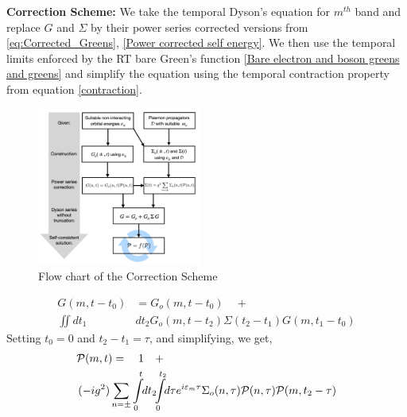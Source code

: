 \documentclass[%
 reprint,
 amsmath,amssymb,
 aps,prl,
floatfix
]{revtex4-2}
\begin{document}
\textbf{Correction Scheme: }We take the temporal Dyson's equation for $m^{th}$ band and replace $G$ and $\Sigma$ by their power series corrected versions from \eqref{eq:Corrected_Greens}, \eqref{Power corrected self energy}. We then use the temporal limits enforced by the RT bare Green's function \eqref{Bare electron and boson greens and  greens} and simplify the equation using the temporal contraction property from equation \eqref{contraction}. 
 \begin{figure}
    \centering
    \includegraphics[height = 9 cm,width = 0.48\textwidth]{Flow_chart.001.png}
    \caption{Flow chart of the Correction Scheme}
    \label{Flow Chart}
\end{figure}
\begin{equation*}
\begin{split}
     G(m,t-t_0) &=  G_o(m,t-t_0) \quad +\\
     \!\!\iint d{t_1} &d{t_2} G_o(m,t-t_2)\Sigma(t_2-t_1)G(m,t_1-t_0)
\end{split}
\end{equation*}
Setting $t_0=0$ and $t_2-t_1 = \tau$, and simplifying, we get,
\begin{equation*}
\begin{split}
    \mathcal{P}(m,t) =  \quad 1 &\quad+\\
    (-ig^2)\sum_{n=\pm}\int\displaylimits_{0}^{t} & \! dt_2 \!\!\int \displaylimits_{0}^{t_2}\!\!d \tau  e^{i\varepsilon_{m}\tau}\Sigma_o(n,\tau)\mathcal{P}(n,\tau) \mathcal{P}(m,t_2-\tau)
\end{split}
\end{equation*}
\end{document}
